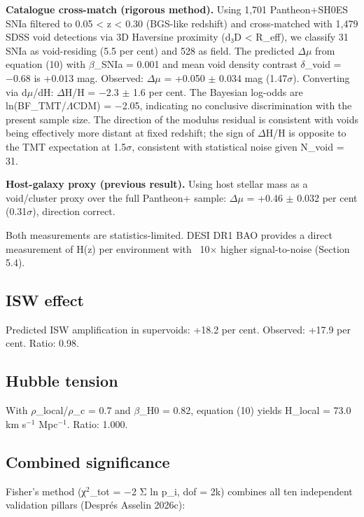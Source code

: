 \documentclass[a4paper,fleqn,usenatbib]{mnras}
\begin{document}
\textbf{Catalogue cross-match (rigorous method).} Using 1,701 Pantheon+SH0ES SNIa filtered to 0.05 < z < 0.30 (BGS-like redshift) and cross-matched with 1,479 SDSS void detections via 3D Haversine proximity (d₃D < R_eff), we classify 31 SNIa as void-residing (5.5 per cent) and 528 as field. The predicted $\Delta$$\mu$ from equation (10) with $\beta$_SNIa = 0.001 and mean void density contrast $\delta$_void = −0.68 is +0.013 mag. Observed: $\Delta$$\mu$ = +0.050 $\pm$ 0.034 mag (1.47$\sigma$). Converting via d$\mu$/dH: $\Delta$H/H = −2.3 $\pm$ 1.6 per cent. The Bayesian log-odds are ln(BF_TMT/$\Lambda$CDM) = −2.05, indicating no conclusive discrimination with the present sample size. The direction of the modulus residual is consistent with voids being effectively more distant at fixed redshift; the sign of $\Delta$H/H is opposite to the TMT expectation at 1.5$\sigma$, consistent with statistical noise given N_void = 31.

\textbf{Host-galaxy proxy (previous result).} Using host stellar mass as a void/cluster proxy over the full Pantheon+ sample: $\Delta$$\mu$ = +0.46 $\pm$ 0.032 per cent (0.31$\sigma$), direction correct.

Both measurements are statistics-limited. DESI DR1 BAO provides a direct measurement of H(z) per environment with ~10$\times$ higher signal-to-noise (Section 5.4).


\subsection{ISW effect}\label{sec:4-7-isw-effect}

Predicted ISW amplification in supervoids: +18.2 per cent. Observed: +17.9 per cent. Ratio: 0.98.


\subsection{Hubble tension}\label{sec:4-8-hubble-tension}

With $\rho$_local/$\rho$_c = 0.7 and $\beta$_H0 = 0.82, equation (10) yields H_local = 73.0 km s$^{-1}$ Mpc$^{-1}$. Ratio: 1.000.


\subsection{Combined significance}\label{sec:4-9-combined-significance}

Fisher's method (χ$^{2}$_tot = −2 Σ ln p_i, dof = 2k) combines all ten independent validation pillars (Després Asselin 2026c):
\end{document}
